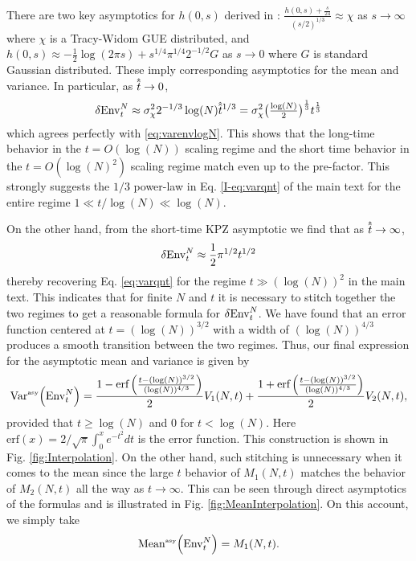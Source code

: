 There are two key asymptotics for $h(0,s)$ derived in \cite{sasamoto_one-dimensional_2010,calabrese_free-energy_2010,dotsenko_bethe_2010,amir_probability_2011}:
$\frac{h(0,s)+\frac{s}{24}}{(s/2)^{1/3}}\approx \chi$ as $s\to\infty$ where $\chi$ is a Tracy-Widom GUE distributed, and
$h(0,s)\approx -\tfrac{1}{2}\log(2\pi s) +s^{1/4} \pi^{1/4}2^{-1/2} G$ as $s\to 0$ where $G$ is standard Gaussian distributed.
These imply corresponding asymptotics for the mean and variance. In particular, as $\hathat{t}\to 0$,
$$
\var{\envnt} \approx \sigma_{\chi}^2 2^{-1/3} \log(N) \hathat{t}^{1/3}  = \sigma_{\chi}^2 \big(\tfrac{\log(N)}{2}\big)^{\frac{1}{3}} t^{\frac{1}{3}}
$$
which agrees perfectly  with \eqref{eq:varenvlogN}. This shows that the long-time behavior in the $t=O(\log(N))$ scaling regime and the short time behavior in the $t=O(\log (N)^2)$ scaling regime match even up to the pre-factor. This strongly suggests the $1/3$ power-law in Eq. \ref{I-eq:varqnt} of the main text for the entire regime $1 \ll t/\log(N) \ll \log (N)$.

On the other hand, from the short-time KPZ asymptotic we find that as $\hathat{t}\to \infty$,
$$
\var{\mathrm{Env}^{N}_t} \approx \frac{1}{2} \pi^{1/2} t^{1/2}
$$
thereby recovering Eq. \eqref{eq:varqnt} for the regime $t\gg (\log(N))^2$ in the main text. This indicates that for finite $N$ and $t$ it is necessary to stitch together the two regimes to get a reasonable formula for $\var{\mathrm{Env}^{N}_t}$.
We have found that an error function centered at $t=(\log(N))^{3/2}$ with a width of $(\log(N))^{4/3}$ produces a smooth transition between the two regimes. Thus, our final expression for the asymptotic mean and variance is given by
\begin{equation}
\label{eq:Var-Total}
\mathrm{Var}^{\textrm{\tiny{asy}}}\!\left(\mathrm{Env}^{N}_t\right) = \frac{1-\text{erf}\left(\tfrac{t-(\log(N))^{3/2}}{(\log(N))^{4/3}}\right)}{2} V_1(N,t)+ \frac{1+\text{erf}\left(\tfrac{t-(\log(N))^{3/2}}{(\log(N))^{4/3}}\right)}{2}V_2(N,t),
\end{equation}
provided that $t\geq \log(N)$ and $0$ for $t<\log(N)$. Here $\text{erf}(x)= 2/\sqrt{\pi} \int_{0}^{x} e^{-t^2}dt$ is the error function. This construction is shown in Fig. \ref{fig:Interpolation}.
On the other hand, such stitching is unnecessary when it comes to the mean since the large $t$ behavior of $M_1(N,t)$ matches the behavior of $M_2(N,t)$ all the way as $t\to \infty$. This can be seen through direct asymptotics of the formulas and is illustrated in Fig. \ref{fig:MeanInterpolation}. On this account, we simply take
\begin{equation}
\label{eq:Mean-Total}
\mathrm{Mean}^{\textrm{\tiny{asy}}}\!\left(\mathrm{Env}^{N}_t\right) =M_1(N,t).
\end{equation}

